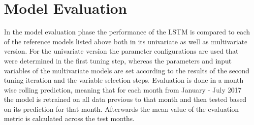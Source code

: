 \section{Model Evaluation}
In the model evaluation phase the performance of the LSTM is compared to each of the reference models listed above both in its univariate as well as multivariate version. For the univariate version the parameter configurations are used that were determined in the first tuning step, whereas the parameters and input variables of the multivariate models are set according to the results of the second tuning iteration and the variable selection steps. Evaluation is done in a month wise rolling prediction, meaning that for each month from January - July 2017 the model is retrained on all data previous to that month and then tested based on its prediction for that month. Afterwards the mean value of the evaluation metric is calculated across the test months.
